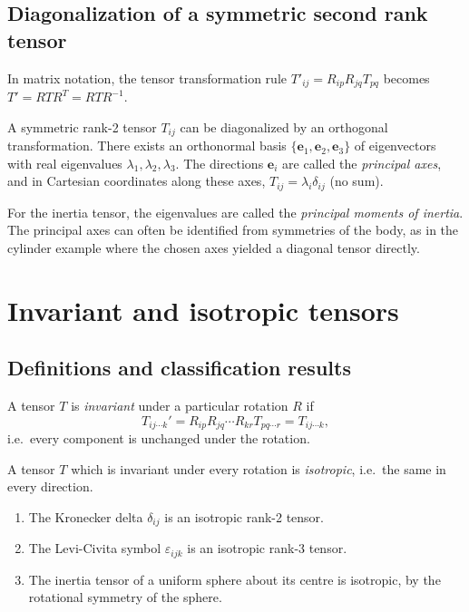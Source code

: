 \documentclass[a4paper]{article}
\begin{document}
\subsection{Diagonalization of a symmetric second rank tensor}

\begin{rmk}
  In matrix notation, the tensor transformation rule $T'_{ij} = R_{ip}R_{jq}T_{pq}$ becomes $T' = RTR^T = RTR^{-1}$.
\end{rmk}

\begin{prop}
  A symmetric rank-2 tensor $T_{ij}$ can be diagonalized by an orthogonal transformation. There exists an orthonormal basis $\{\mathbf{e}_1, \mathbf{e}_2, \mathbf{e}_3\}$ of eigenvectors with real eigenvalues $\lambda_1, \lambda_2, \lambda_3$. The directions $\mathbf{e}_i$ are called the \emph{principal axes}, and in Cartesian coordinates along these axes, $T_{ij} = \lambda_i \delta_{ij}$ (no sum).
\end{prop}

\begin{rmk}
  For the inertia tensor, the eigenvalues are called the \emph{principal moments of inertia}. The principal axes can often be identified from symmetries of the body, as in the cylinder example where the chosen axes yielded a diagonal tensor directly.
\end{rmk}

\section{Invariant and isotropic tensors}
\subsection{Definitions and classification results}
\begin{defi}
  A tensor $T$ is \emph{invariant} under a particular rotation $R$ if
  \[
    T_{ij\cdots k}' = R_{ip}R_{jq}\cdots R_{kr}T_{pq\cdots r} = T_{ij\cdots k},
  \]
  i.e.\ every component is unchanged under the rotation.

  A tensor $T$ which is invariant under every rotation is \emph{isotropic}, i.e.\ the same in every direction.
\end{defi}

\begin{eg}\leavevmode
  \begin{enumerate}
    \item The Kronecker delta $\delta_{ij}$ is an isotropic rank-2 tensor.
    \item The Levi-Civita symbol $\varepsilon_{ijk}$ is an isotropic rank-3 tensor.
    \item The inertia tensor of a uniform sphere about its centre is isotropic, by the rotational symmetry of the sphere.
  \end{enumerate}
\end{eg}
\end{document}
